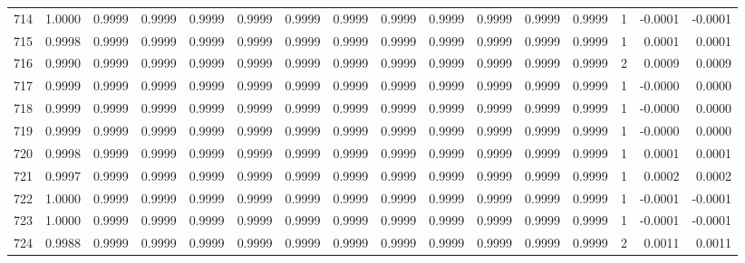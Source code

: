 \begin{tabular}{lrrrrrrrrrrrrrrr}
714 &      1.0000 &  0.9999 &  0.9999 &  0.9999 &  0.9999 &  0.9999 &  0.9999 &  0.9999 &  0.9999 &  0.9999 &   0.9999 &     0.9999 &      1 &                   -0.0001 &                    -0.0001 \\
715 &      0.9998 &  0.9999 &  0.9999 &  0.9999 &  0.9999 &  0.9999 &  0.9999 &  0.9999 &  0.9999 &  0.9999 &   0.9999 &     0.9999 &      1 &                    0.0001 &                     0.0001 \\
716 &      0.9990 &  0.9999 &  0.9999 &  0.9999 &  0.9999 &  0.9999 &  0.9999 &  0.9999 &  0.9999 &  0.9999 &   0.9999 &     0.9999 &      2 &                    0.0009 &                     0.0009 \\
717 &      0.9999 &  0.9999 &  0.9999 &  0.9999 &  0.9999 &  0.9999 &  0.9999 &  0.9999 &  0.9999 &  0.9999 &   0.9999 &     0.9999 &      1 &                   -0.0000 &                     0.0000 \\
718 &      0.9999 &  0.9999 &  0.9999 &  0.9999 &  0.9999 &  0.9999 &  0.9999 &  0.9999 &  0.9999 &  0.9999 &   0.9999 &     0.9999 &      1 &                   -0.0000 &                     0.0000 \\
719 &      0.9999 &  0.9999 &  0.9999 &  0.9999 &  0.9999 &  0.9999 &  0.9999 &  0.9999 &  0.9999 &  0.9999 &   0.9999 &     0.9999 &      1 &                   -0.0000 &                     0.0000 \\
720 &      0.9998 &  0.9999 &  0.9999 &  0.9999 &  0.9999 &  0.9999 &  0.9999 &  0.9999 &  0.9999 &  0.9999 &   0.9999 &     0.9999 &      1 &                    0.0001 &                     0.0001 \\
721 &      0.9997 &  0.9999 &  0.9999 &  0.9999 &  0.9999 &  0.9999 &  0.9999 &  0.9999 &  0.9999 &  0.9999 &   0.9999 &     0.9999 &      1 &                    0.0002 &                     0.0002 \\
722 &      1.0000 &  0.9999 &  0.9999 &  0.9999 &  0.9999 &  0.9999 &  0.9999 &  0.9999 &  0.9999 &  0.9999 &   0.9999 &     0.9999 &      1 &                   -0.0001 &                    -0.0001 \\
723 &      1.0000 &  0.9999 &  0.9999 &  0.9999 &  0.9999 &  0.9999 &  0.9999 &  0.9999 &  0.9999 &  0.9999 &   0.9999 &     0.9999 &      1 &                   -0.0001 &                    -0.0001 \\
724 &      0.9988 &  0.9999 &  0.9999 &  0.9999 &  0.9999 &  0.9999 &  0.9999 &  0.9999 &  0.9999 &  0.9999 &   0.9999 &     0.9999 &      2 &                    0.0011 &                     0.0011 \\

\end{tabular}
